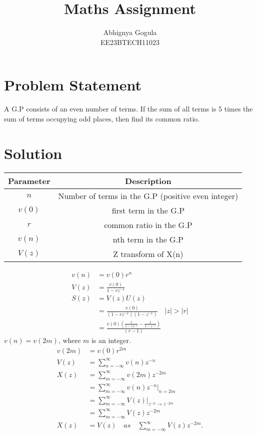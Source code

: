 \documentclass{article}
\begin{document}
\title{Maths Assignment}
\author{Abhignya Gogula\\
        EE23BTECH11023}
\maketitle
\section*{Problem Statement}
A G.P consists of an even number of terms. If the sum of all terms is 5 times the sum of terms occupying odd places, then find its common ratio.
\section*{Solution}
\begin{table}[h!]
\centering
\begin{tabular}{|c|c|}
\hline
Parameter & Description \\
\hline
\( n \) & Number of terms in the G.P (positive even integer) \\
\hline
\(v(0) \) & first term in the G.P \\
\hline
\( r \) & common ratio in the G.P \\
\hline
\( v(n) \) & nth term in the G.P \\
\hline
\( V(z) \) & Z transform of X(n) \\
\hline
\end{tabular}
\end{table}
\begin{align}
v(n) &= v(0)r^n \\
V(z) &= \frac{v(0)}{1-rz^{-1}} \\
S(z) &= V(z)U(z) \\
     &= \frac{v(0)}{(1-rz^{-1})(1-z^{-1})} \quad \lvert z \rvert > \lvert r \rvert \\
     &= \frac{v(0)(\frac{r}{1-rz^{-1}}-\frac{1}{1-z^{-1}})}{(r-1)}
\end{align}
\(v(n)=v(2m)\), where \(m\) is an integer.\\
\begin{align}
v(2m)&=v(0)r^{2m}\\
V(z) & = \sum_{n=-\infty}^{\infty} v(n)z^{-n} \\
X(z) & = \sum_{m=-\infty}^{\infty} v(2m)z^{-2m} \\
     & = \sum_{m=-\infty}^{\infty} v(n)z^{-n} \Bigg|_{n=2m} \\
     & = \sum_{m=-\infty}^{\infty} V(z) \Bigg|_{z^{-n} \rightarrow z^{-2m}} \\
     & = \sum_{m=-\infty}^{\infty} V(z)z^{-2m}\\
X(z) &= V(z) \quad as \quad \sum_{m=-\infty}^{\infty} V(z)z^{-2m}.
\end{align}
\end{document}
